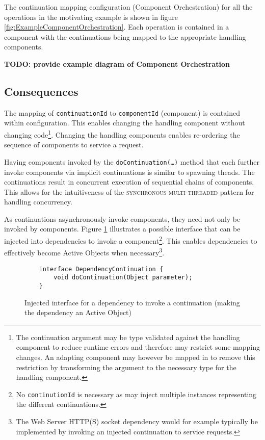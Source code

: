\documentclass[prodmode]{style/acmlarge}
\begin{document}
The continuation mapping configuration (Component Orchestration) for all the
operations in the motivating example is shown in figure
\ref{fig:ExampleComponentOrchestration}.  Each operation is contained in a
component with the continuations being mapped to the appropriate handling
components.

\textbf{TODO: provide example diagram of Component Orchestration}


\subsection{Consequences}

The mapping of \texttt{continuationId} to \texttt{componentId} (component) is
contained within configuration.  This enables changing the handling component
without changing code\footnote{The continuation argument may be type validated
against the handling component to reduce runtime errors and therefore may
restrict some mapping changes.  An adapting component may however be mapped in
to remove this restriction by transforming the argument to the necessary type
for the handling component.}.  Changing the handling components enables
re-ordering the sequence of components to service a request.

Having components invoked by the \texttt{doContinuation(\ldots)} method that
each further invoke components via implicit continuations is similar to spawning
theads.  The continuations result in concurrent execution of sequential chains
of components.  This allows for the intuitiveness of the \textsc{synchronous
multi-threaded} pattern \cite{proactor} for handling concurrency.

As continuations asynchronously invoke components, they need not only be invoked
by components. Figure \ref{fig:DC_interface} illustrates a possible interface
that can be injected into dependencies to invoke a component\footnote{No
\texttt{continutionId} is necessary as may inject multiple instances
representing the different continuations.}.  This enables dependencies to
effectively become Active Objects \cite{active-object} when
necessary\footnote{The Web Server HTTP(S) socket dependency would for example
typically be implemented by invoking an injected continuation to service
requests.}.

\begin{figure}[tp]
\begin{verbatim}
    interface DependencyContinuation {
        void doContinuation(Object parameter);
    }
\end{verbatim}
\caption{Injected interface for a dependency to invoke a continuation (making the dependency an Active Object)}
\label{fig:DC_interface}
\end{figure}
\end{document}
